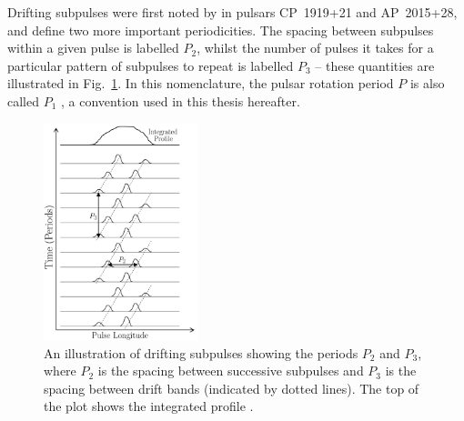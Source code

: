 Drifting subpulses were first noted by \citet{DCxx1968} in pulsars CP~1919+21 and AP~2015+28, and define two more important periodicities. The spacing between subpulses within a given pulse is labelled $P_2$, whilst the number of pulses it takes for a particular pattern of subpulses to repeat is labelled $P_3$ \citep{SSPW1970} -- these quantities are illustrated in Fig.~\ref{fig: intro - drifting subpulses}. In this nomenclature, the pulsar rotation period $P$ is also called $P_1$ \citep{Bxxx1973}, a convention used in this thesis hereafter.
\begin{figure}
	\centering
	\includegraphics[width=0.4\textwidth]{Figures/Introduction/drifting_subpulses}
    \caption[Drifting subpulses and the definitions of $P_2$ and $P_3$]{An illustration of drifting subpulses showing the periods $P_2$ and $P_3$, where $P_2$ is the spacing between successive subpulses and $P_3$ is the spacing between drift bands (indicated by dotted lines). The top of the plot shows the integrated profile \citep[after][]{Bxxx1973}.}
    \label{fig: intro - drifting subpulses} 
\end{figure}

